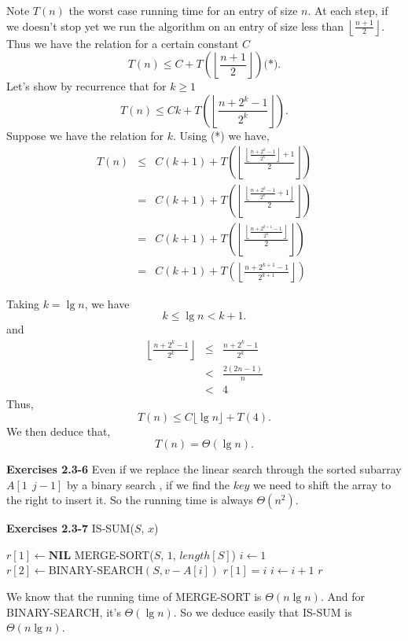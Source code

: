\documentclass[a4paper,12pt]{article}
\newcommand{\newpar}[1]
{\bigskip \noindent \textbf{Exercises #1} \newline}
\newcommand{\la}{\leftarrow}
\begin{document}
Note $T(n)$ the worst case running time for an entry of size $n$.  At
each step, if we doesn't stop yet we run the algorithm on an entry of
size less than $\left\lfloor\frac{n+1}{2}\right\rfloor$.  Thus we have
the relation for a certain constant $C$
\[ T(n) \le C + 
T\left(\left\lfloor\frac{n+1}{2}\right\rfloor\right) \mbox{(*)}.\]
Let's show by recurrence that for $k \ge 1$
\[ T(n) \le C k + 
T\left(\left\lfloor\frac{n+2^k-1}{2^k}\right\rfloor\right).\]
Suppose we have the relation for $k$.  Using (*) we have,
\begin{eqnarray*}
T(n) &\le& C(k+1) + T\left(\left\lfloor\frac{
\left\lfloor\frac{n + 2^k - 1}{2^k}\right\rfloor + 1
}{2}\right\rfloor\right)\\ &=&
C(k+1) + T\left(\left\lfloor\frac{
\left\lfloor\frac{n + 2^k - 1}{2^k} + 1\right\rfloor
}{2}\right\rfloor\right)\\ &=&
C(k+1) + T\left(\left\lfloor\frac{
\left\lfloor\frac{n + 2^{k+1} - 1}{2^k}\right\rfloor
}{2}\right\rfloor\right)\\ &=&
C(k+1) + T\left(\left\lfloor
\frac{n + 2^{k+1} - 1}{2^{k+1}}\right\rfloor\right)
\end{eqnarray*}

\medskip
Taking $k = \lg n$, we have
\[ k \le \lg n < k+1.\]
and
\begin{eqnarray*}
\left\lfloor\frac{n + 2^k - 1}{2^k}\right\rfloor &\le&
\frac{n+2^k-1}{2^k}\\ &<&
\frac{2(2n-1)}{n}\\ &<&
4
\end{eqnarray*}
Thus,
\[ T(n) \le C \lfloor \lg n \rfloor + T(4).\]
We then deduce that,
\[ T(n) = \Theta(\lg n).\]

\newpar{2.3-6} Even if we replace the linear search through the sorted
subarray $A[1\ \ j-1]$ by a binary search , if we find the $key$ we
need to shift the array to the right to insert it.  So the running
time is always $\Theta(n^2)$.

\newpar{2.3-7}
IS-SUM($S$, $x$)
\begin{algorithmic}
\STATE $r[1] \la \mathbf{NIL}$ 
\STATE MERGE-SORT($S$, $1$, $length[S]$)
\STATE $i \la 1$
	\STATE $r[2] \la \mbox{BINARY-SEARCH}(S, v - A[i]) $
		\STATE $r[1] = i$
	\ENDIF
	\STATE $i \la i+1$
\ENDWHILE
\RETURN $r$	
\end{algorithmic}

We know that the running time of MERGE-SORT is $\Theta(n\lg n)$.  And
for BINARY-SEARCH, it's $\Theta(\lg n)$.  So we deduce easily that
IS-SUM is $\Theta(n\lg n)$.
\end{document}
